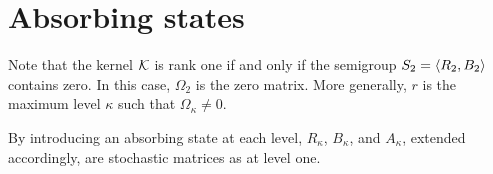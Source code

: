 

\section{Absorbing states}
\label{sec:7.4}

Note that the kernel ${\mathcal K}$ is rank one if and only if the semigroup $S_2=\avg R_2,B_2.$
contains zero. In this case, $\Omega_2$ is the zero matrix. More generally, $r$ is the maximum
level $\kappa$ such that $\Omega_\kappa\ne0$.

By introducing an absorbing state at each level, $R_\kappa$, $B_\kappa$, and $A_\kappa$, extended accordingly, are stochastic matrices as at level one.




